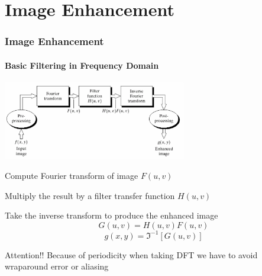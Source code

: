 \documentclass{beamer}
\begin{document}
\section{Image Enhancement}
\begin{frame}
\frametitle{Image Enhancement}
\framesubtitle{Basic Filtering in Frequency Domain}
\begin{itemize}
	\item[]
	\begin{center}
	\includegraphics[width = 0.6\textwidth, height = 0.22\textheight]{images/F1_steps.png}
	\end{center}
	\scriptsize{
	\item Compute Fourier transform of image $F(u,v)$
	\item Multiply the result by a filter transfer function $H(u,v)$
	\item Take the inverse transform to produce the enhanced image 
	$$G(u,v) = H(u,v) F(u,v)$$
	$$g(x,y) = \Im^{-1}[G(u,v)] $$
	}
\end{itemize}
\scriptsize{	
\begin{block}{Attention!!}
Because of periodicity when taking DFT we have to avoid wraparound error or aliasing
\end{block}}
\end{frame}
\end{document}
